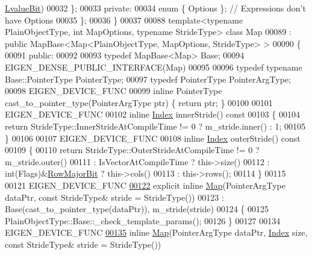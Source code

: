 \begin{DoxyCode}
      \hyperlink{group__flags_gae2c323957f20dfdc6cb8f44428eaec1a}{LvalueBit})
00032   \};
00033 \textcolor{keyword}{private}:
00034   \textcolor{keyword}{enum} \{ Options \}; \textcolor{comment}{// Expressions don't have Options}
00035 \};
00036 \}
00037 
00088 \textcolor{keyword}{template}<\textcolor{keyword}{typename} PlainObjectType, \textcolor{keywordtype}{int} MapOptions, \textcolor{keyword}{typename} Str\textcolor{keywordtype}{id}eType> \textcolor{keyword}{class }Map
00089   : \textcolor{keyword}{public} MapBase<Map<PlainObjectType, MapOptions, StrideType> >
00090 \{
00091   \textcolor{keyword}{public}:
00092 
00093     \textcolor{keyword}{typedef} MapBase<Map> Base;
00094     EIGEN\_DENSE\_PUBLIC\_INTERFACE(Map)
00095 
00096     \textcolor{keyword}{typedef} \textcolor{keyword}{typename} Base::PointerType PointerType;
00097     \textcolor{keyword}{typedef} PointerType PointerArgType;
00098     EIGEN\_DEVICE\_FUNC
00099     \textcolor{keyword}{inline} PointerType cast\_to\_pointer\_type(PointerArgType ptr) \{ \textcolor{keywordflow}{return} ptr; \}
00100 
00101     EIGEN\_DEVICE\_FUNC
00102     \textcolor{keyword}{inline} \hyperlink{namespace_eigen_a62e77e0933482dafde8fe197d9a2cfde}{Index} innerStride()\textcolor{keyword}{ const}
00103 \textcolor{keyword}{    }\{
00104       \textcolor{keywordflow}{return} StrideType::InnerStrideAtCompileTime != 0 ? m\_stride.inner() : 1;
00105     \}
00106 
00107     EIGEN\_DEVICE\_FUNC
00108     \textcolor{keyword}{inline} \hyperlink{namespace_eigen_a62e77e0933482dafde8fe197d9a2cfde}{Index} outerStride()\textcolor{keyword}{ const}
00109 \textcolor{keyword}{    }\{
00110       \textcolor{keywordflow}{return} StrideType::OuterStrideAtCompileTime != 0 ? m\_stride.outer()
00111            : IsVectorAtCompileTime ? this->size()
00112            : int(Flags)&\hyperlink{group__flags_gae4f56c2a60bbe4bd2e44c5b19cbe8762}{RowMajorBit} ? this->cols()
00113            : this->rows();
00114     \}
00115 
00121     EIGEN\_DEVICE\_FUNC
\hyperlink{group___core___module_ac95a2928eaa9c727c4499d3723f8f459}{00122}     \textcolor{keyword}{explicit} \textcolor{keyword}{inline} \hyperlink{group___core___module_ac95a2928eaa9c727c4499d3723f8f459}{Map}(PointerArgType dataPtr, \textcolor{keyword}{const} StrideType& stride = StrideType())
00123       : Base(cast\_to\_pointer\_type(dataPtr)), m\_stride(stride)
00124     \{
00125       PlainObjectType::Base::\_check\_template\_params();
00126     \}
00127 
00134     EIGEN\_DEVICE\_FUNC
\hyperlink{group___core___module_a834d01d67c1401b022f00260e9dd2108}{00135}     \textcolor{keyword}{inline} \hyperlink{group___core___module_a834d01d67c1401b022f00260e9dd2108}{Map}(PointerArgType dataPtr, \hyperlink{namespace_eigen_a62e77e0933482dafde8fe197d9a2cfde}{Index} size, \textcolor{keyword}{const} StrideType& stride = StrideType())

\end{DoxyCode}
